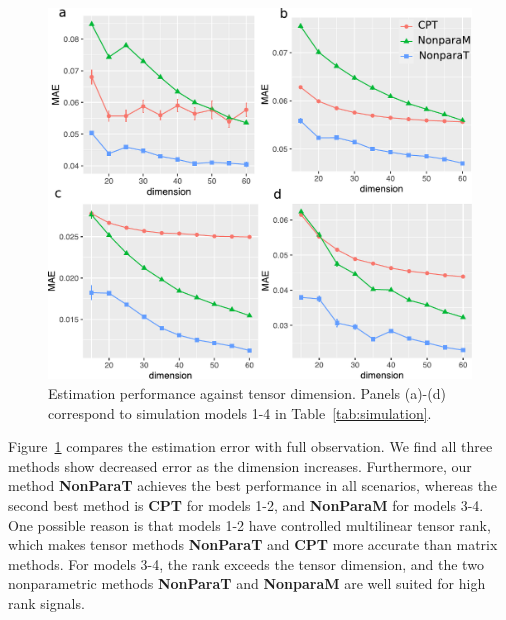 \documentclass{article}
\theoremstyle{plain}
\theoremstyle{definition}
\begin{document}
\begin{figure}[h!]
\vspace{-.2cm}
\includegraphics[width=.45\textwidth]{figure/fig1-4.pdf}
\vspace{-.3cm}
\caption{Estimation performance against tensor dimension. Panels (a)-(d) correspond to simulation models 1-4 in Table~\ref{tab:simulation}.}\label{fig:compare1}
\vspace{-.2cm}
\end{figure}


Figure~\ref{fig:compare1} compares the estimation error with full observation. We find all three methods show decreased error as the dimension increases. Furthermore, our method {\bf NonParaT} achieves the best performance in all scenarios, whereas the second best method is {\bf CPT} for models 1-2, and {\bf NonParaM} for models 3-4. One possible reason is that models 1-2 have controlled multilinear tensor rank, which makes tensor methods {\bf NonParaT} and {\bf CPT} more accurate than matrix methods. For models 3-4, the rank exceeds the tensor dimension, and the two nonparametric methods {\bf NonParaT} and {\bf NonparaM} are well suited for high rank signals. 

\end{document}
